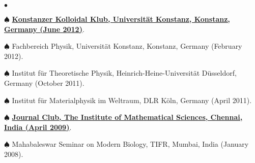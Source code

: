 \documentclass[margin,line]{res}
\newenvironment{list2}{
  \begin{list}{$\bullet$}{%
      \setlength{\itemsep}{0in}
      \setlength{\parsep}{0in} \setlength{\parskip}{0in}
      \setlength{\topsep}{0in} \setlength{\partopsep}{0in} 
      \setlength{\leftmargin}{0.2in}}}{\end{list}}
\begin{document}
\begin{resume}
\begin{list2}
\item[$\spadesuit$] \href{http://www.slideshare.net/AmitBhattacharjee14/kinetic-pathways-to-the-isotropicnematic-phase-transformation-a-mean-field-approach}{\bf 
      Konstanzer Kolloidal Klub, Universit\"at Konstanz, Konstanz, Germany (June 2012)}.
\item[$\spadesuit$] Fachbereich Physik, Universit\"at Konstanz, Konstanz, Germany (February 2012).
\item[$\spadesuit$] Institut f\"ur Theoretische Physik, Heinrich-Heine-Universit\"at D\"usseldorf, Germany (October 2011).
\item[$\spadesuit$] Institut f\"ur Materialphysik im Weltraum, DLR K\"oln, Germany (April 2011). 
\item[$\spadesuit$] \href{http://www.slideshare.net/AmitBhattacharjee14/nonabelian-vortices-energetics-vs-topology}{\bf Journal Club, The Institute of 
      Mathematical Sciences, Chennai, India (April 2009)}.
\item[$\spadesuit$] Mahabaleswar Seminar on Modern Biology, TIFR, Mumbai, India (January 2008). 
\end{list2}


\end{resume}
\end{document}
